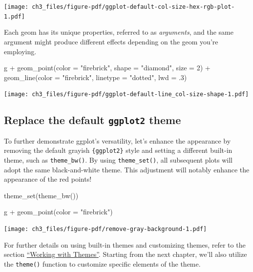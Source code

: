 \documentclass[
  letterpaper,
  DIV=11,
  numbers=noendperiod]{scrreprt}
\newenvironment{Shaded}{\begin{snugshade}}{\end{snugshade}}
\newcommand{\AttributeTok}[1]{\textcolor[rgb]{0.40,0.45,0.13}{#1}}
\newcommand{\DecValTok}[1]{\textcolor[rgb]{0.68,0.00,0.00}{#1}}
\newcommand{\FunctionTok}[1]{\textcolor[rgb]{0.28,0.35,0.67}{#1}}
\newcommand{\NormalTok}[1]{\textcolor[rgb]{0.00,0.23,0.31}{#1}}
\newcommand{\SpecialCharTok}[1]{\textcolor[rgb]{0.37,0.37,0.37}{#1}}
\newcommand{\StringTok}[1]{\textcolor[rgb]{0.13,0.47,0.30}{#1}}
\begin{document}
\texttt{[image: ch3\_files/figure-pdf/ggplot-default-col-size-hex-rgb-plot-1.pdf]}

Each geom has its unique properties, referred to as \emph{arguments},
and the same argument might produce different effects depending on the
geom you're employing.

\begin{Shaded}
\begin{Highlighting}[]
\NormalTok{g }\SpecialCharTok{+} \FunctionTok{geom\_point}\NormalTok{(}\AttributeTok{color =} \StringTok{"firebrick"}\NormalTok{, }\AttributeTok{shape =} \StringTok{"diamond"}\NormalTok{, }\AttributeTok{size =} \DecValTok{2}\NormalTok{) }\SpecialCharTok{+}
    \FunctionTok{geom\_line}\NormalTok{(}\AttributeTok{color =} \StringTok{"firebrick"}\NormalTok{, }\AttributeTok{linetype =} \StringTok{"dotted"}\NormalTok{, }\AttributeTok{lwd =}\NormalTok{ .}\DecValTok{3}\NormalTok{)}
\end{Highlighting}
\end{Shaded}

\texttt{[image: ch3\_files/figure-pdf/ggplot-default-line\_col-size-shape-1.pdf]}

\subsection{\texorpdfstring{Replace the default \texttt{ggplot2}
theme}{Replace the default ggplot2 theme}}\label{replace-the-default-ggplot2-theme}

To further demonstrate ggplot's versatility, let's enhance the
appearance by removing the default grayish \texttt{\{ggplot2\}} style
and setting a different built-in theme, such as \texttt{theme\_bw()}. By
using \texttt{theme\_set()}, all subsequent plots will adopt the same
black-and-white theme. This adjustment will notably enhance the
appearance of the red points!

\begin{Shaded}
\begin{Highlighting}[]
\FunctionTok{theme\_set}\NormalTok{(}\FunctionTok{theme\_bw}\NormalTok{())}

\NormalTok{g }\SpecialCharTok{+} \FunctionTok{geom\_point}\NormalTok{(}\AttributeTok{color =} \StringTok{"firebrick"}\NormalTok{)}
\end{Highlighting}
\end{Shaded}

\texttt{[image: ch3\_files/figure-pdf/remove-gray-background-1.pdf]}

For further details on using built-in themes and customizing themes,
refer to the section \hyperref[themes]{``Working with Themes''}.
Starting from the next chapter, we'll also utilize the \texttt{theme()}
function to customize specific elements of the theme.
\end{document}
